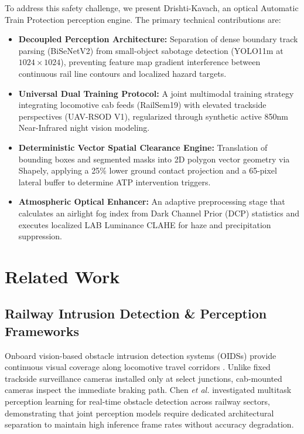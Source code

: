 \documentclass[conference]{IEEEtran}
\begin{document}
To address this safety challenge, we present Drishti-Kavach, an optical Automatic Train Protection perception engine. The primary technical contributions are:
\begin{itemize}
    \item \textbf{Decoupled Perception Architecture:} Separation of dense boundary track parsing (BiSeNetV2) from small-object sabotage detection (YOLO11m at $1024\times1024$), preventing feature map gradient interference between continuous rail line contours and localized hazard targets.
    \item \textbf{Universal Dual Training Protocol:} A joint multimodal training strategy integrating locomotive cab feeds (RailSem19) with elevated trackside perspectives (UAV-RSOD V1), regularized through synthetic active 850nm Near-Infrared night vision modeling.
    \item \textbf{Deterministic Vector Spatial Clearance Engine:} Translation of bounding boxes and segmented masks into 2D polygon vector geometry via Shapely, applying a 25\% lower ground contact projection and a 65-pixel lateral buffer to determine ATP intervention triggers.
    \item \textbf{Atmospheric Optical Enhancer:} An adaptive preprocessing stage that calculates an airlight fog index from Dark Channel Prior (DCP) statistics and executes localized LAB Luminance CLAHE for haze and precipitation suppression.
\end{itemize}

\section{Related Work}

\subsection{Railway Intrusion Detection \& Perception Frameworks}
Onboard vision-based obstacle intrusion detection systems (OIDSs) provide continuous visual coverage along locomotive travel corridors \cite{xu2025advancements}. Unlike fixed trackside surveillance cameras installed only at select junctions, cab-mounted cameras inspect the immediate braking path. Chen \textit{et al.} \cite{chen2025realtime} investigated multitask perception learning for real-time obstacle detection across railway sectors, demonstrating that joint perception models require dedicated architectural separation to maintain high inference frame rates without accuracy degradation.
\end{document}
